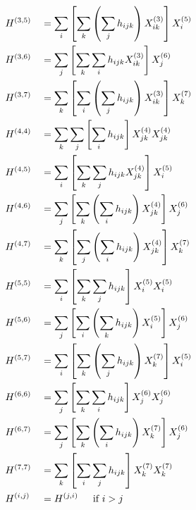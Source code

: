 \documentclass[12pt]{article}
\begin{document}
\begin{itemize}
\begin{multicols}{2}
\begin{equation*}
	\begin{aligned}
		& H^{(3,5)} && = \sum_{i} \left[ \sum_{k} \left( \sum_{j} h_{ijk} \right) X^{(3)}_{ik} \right] X^{(5)}_{i} \\
		& H^{(3,6)} && = \sum_{j} \left[ \sum_{k} \sum_{i} h_{ijk} X^{(3)}_{ik} \right] X^{(6)}_{j} \\
		& H^{(3,7)} && = \sum_{k} \left[ \sum_{i} \left( \sum_{j} h_{ijk} \right) X^{(3)}_{ik} \right] X^{(7)}_{k} \\
		& H^{(4,4)} && = \sum_{k} \sum_{j} \left[ \sum_{i}  h_{ijk} \right] X^{(4)}_{jk} X^{(4)}_{jk} \\
		& H^{(4,5)} && = \sum_{i} \left[ \sum_{k} \sum_{j} h_{ijk} X^{(4)}_{jk} \right] X^{(5)}_{i} \\
		& H^{(4,6)} && = \sum_{j} \left[ \sum_{k} \left( \sum_{i} h_{ijk} \right) X^{(4)}_{jk} \right] X^{(6)}_{j} \\
		& H^{(4,7)} && = \sum_{k} \left[ \sum_{j} \left( \sum_{i} h_{ijk} \right) X^{(4)}_{jk} \right] X^{(7)}_{k}  \\
		& H^{(5,5)} && = \sum_{i} \left[ \sum_{k} \sum_{j} h_{ijk} \right] X^{(5)}_{i} X^{(5)}_{i} \\
		& H^{(5,6)} && = \sum_{j} \left[ \sum_{i} \left( \sum_{k} h_{ijk} \right) X^{(5)}_{i} \right] X^{(6)}_{j} \\
		& H^{(5,7)} && = \sum_{i} \left[ \sum_{k}  \left( \sum_{j} h_{ijk} \right) X^{(7)}_{k} \right] X^{(5)}_{i} \\
		& H^{(6,6)} && = \sum_{j} \left[ \sum_{k} \sum_{i} h_{ijk} \right] X^{(6)}_{j} X^{(6)}_{j} \\
		& H^{(6,7)} && = \sum_{j} \left[ \sum_{k} \left( \sum_{i} h_{ijk} \right) X^{(7)}_{k} \right] X^{(6)}_{j} \\
		& H^{(7,7)} && = \sum_{k} \left[ \sum_{i} \sum_{j} h_{ijk} \right] X^{(7)}_{k} X^{(7)}_{k} \\
		& H^{(i,j)} && = H^{(j,i)} \hspace*{15pt} \text{if } i > j \\
	\end{aligned}
	\end{equation*}
\end{multicols}

\end{itemize}
\end{document}
